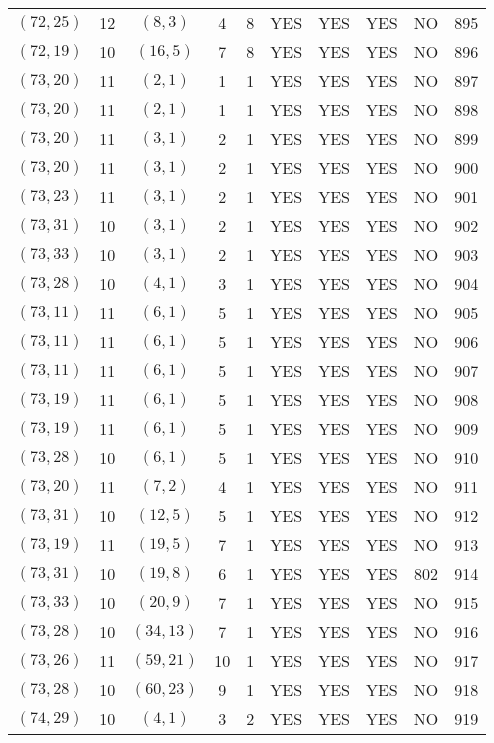 \begin{longtable}{|c|c|c|c|c|c|c|c|c|c|}
$(72, 25)$ & 12 & $(8, 3)$ & 4 & 8 & YES & YES & YES & NO & 895\\
$(72, 19)$ & 10 & $(16, 5)$ & 7 & 8 & YES & YES & YES & NO & 896\\
$(73, 20)$ & 11 & $(2, 1)$ & 1 & 1 & YES & YES & YES & NO & 897\\
$(73, 20)$ & 11 & $(2, 1)$ & 1 & 1 & YES & YES & YES & NO & 898\\
$(73, 20)$ & 11 & $(3, 1)$ & 2 & 1 & YES & YES & YES & NO & 899\\
$(73, 20)$ & 11 & $(3, 1)$ & 2 & 1 & YES & YES & YES & NO & 900\\
$(73, 23)$ & 11 & $(3, 1)$ & 2 & 1 & YES & YES & YES & NO & 901\\
$(73, 31)$ & 10 & $(3, 1)$ & 2 & 1 & YES & YES & YES & NO & 902\\
$(73, 33)$ & 10 & $(3, 1)$ & 2 & 1 & YES & YES & YES & NO & 903\\
$(73, 28)$ & 10 & $(4, 1)$ & 3 & 1 & YES & YES & YES & NO & 904\\
$(73, 11)$ & 11 & $(6, 1)$ & 5 & 1 & YES & YES & YES & NO & 905\\
$(73, 11)$ & 11 & $(6, 1)$ & 5 & 1 & YES & YES & YES & NO & 906\\
$(73, 11)$ & 11 & $(6, 1)$ & 5 & 1 & YES & YES & YES & NO & 907\\
$(73, 19)$ & 11 & $(6, 1)$ & 5 & 1 & YES & YES & YES & NO & 908\\
$(73, 19)$ & 11 & $(6, 1)$ & 5 & 1 & YES & YES & YES & NO & 909\\
$(73, 28)$ & 10 & $(6, 1)$ & 5 & 1 & YES & YES & YES & NO & 910\\
$(73, 20)$ & 11 & $(7, 2)$ & 4 & 1 & YES & YES & YES & NO & 911\\
$(73, 31)$ & 10 & $(12, 5)$ & 5 & 1 & YES & YES & YES & NO & 912\\
$(73, 19)$ & 11 & $(19, 5)$ & 7 & 1 & YES & YES & YES & NO & 913\\
$(73, 31)$ & 10 & $(19, 8)$ & 6 & 1 & YES & YES & YES & 802 & 914\\
$(73, 33)$ & 10 & $(20, 9)$ & 7 & 1 & YES & YES & YES & NO & 915\\
$(73, 28)$ & 10 & $(34, 13)$ & 7 & 1 & YES & YES & YES & NO & 916\\
$(73, 26)$ & 11 & $(59, 21)$ & 10 & 1 & YES & YES & YES & NO & 917\\
$(73, 28)$ & 10 & $(60, 23)$ & 9 & 1 & YES & YES & YES & NO & 918\\
$(74, 29)$ & 10 & $(4, 1)$ & 3 & 2 & YES & YES & YES & NO & 919\\

\end{longtable}
